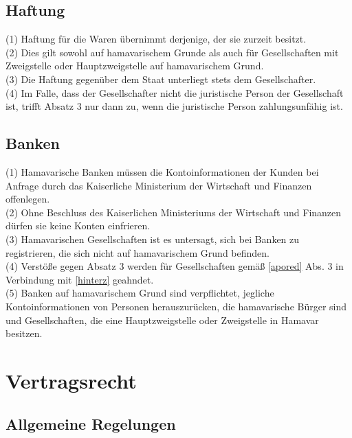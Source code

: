 \documentclass{article}
\begin{document}
\subsection{Haftung}
(1) Haftung für die Waren übernimmt derjenige, der sie zurzeit besitzt.\\
(2) Dies gilt sowohl auf hamavarischem Grunde als auch für Gesellschaften mit Zweigstelle oder Hauptzweigstelle auf hamavarischem Grund.\\
(3) Die Haftung gegenüber dem Staat unterliegt stets dem Gesellschafter.\\
(4) Im Falle, dass der Gesellschafter nicht die juristische Person der Gesellschaft ist, trifft Absatz 3 nur dann zu, wenn die juristische Person zahlungsunfähig ist.

\subsection{Banken}
(1) Hamavarische Banken müssen die Kontoinformationen der Kunden bei Anfrage durch das Kaiserliche Ministerium der Wirtschaft und Finanzen offenlegen.\\
(2) Ohne Beschluss des Kaiserlichen Ministeriums der Wirtschaft und Finanzen dürfen sie keine Konten einfrieren.\\
(3) Hamavarischen Gesellschaften ist es untersagt, sich bei Banken zu registrieren, die sich nicht auf hamavarischem Grund befinden.\\
(4) Verstöße gegen Absatz 3 werden für Gesellschaften gemäß \ref{apored} Abs. 3 in Verbindung mit \ref{hinterz} geahndet.\\
(5) Banken auf hamavarischem Grund sind verpflichtet, jegliche Kontoinformationen von Personen herauszurücken, die hamavarische Bürger sind und Gesellschaften, die eine Hauptzweigstelle oder Zweigstelle in Hamavar besitzen.\\

\section{Vertragsrecht}
\subsection{Allgemeine Regelungen}
\end{document}
